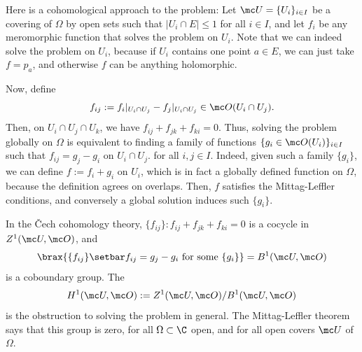 \documentclass[11pt]{report}
\begin{document}
Here is a cohomological approach to the problem: Let $\mc U=\{U_i\}_{i \in I}$ be a covering of $\Omega$ by open sets such that $|U_i \cap E| \leq 1$ for all $i \in I$, and let $f_i$ be any meromorphic function that solves the problem on $U_i$. Note that we can indeed solve the problem on $U_i$, because if $U_i$ contains one point $a \in E$, we can just take $f=p_a$, and otherwise $f$ can be anything holomorphic.

Now, define
$$f_{ij}:=f_i|_{U_i \cap U_j} - f_j|_{U_i \cap U_j} \in \mc O(U_i \cap U_j).$$
Then, on $U_i \cap U_j \cap U_k$, we have $f_{ij}+f_{jk}+f_{ki}=0$. Thus, solving the problem globally on $\Omega$ is equivalent to finding a family of functions $\{g_i \in \mc O(U_i)\}_{i \in I}$ such that $f_{ij}=g_j-g_i$ on $U_i \cap U_j$. for all $i,j \in I$. Indeed, given such a family $\{g_i\}$, we can define $f:= f_i+g_i$ on $U_i$, which is in fact a globally defined function on $\Omega$, because the definition agrees on overlaps. Then, $f$ satisfies the Mittag-Leffler conditions, and conversely a global solution induces such $\{g_i\}$.

In the \v{C}ech cohomology theory, $\{f_{ij}\} : f_{ij}+ f_{jk}+f_{ki}=0$ is a cocycle in $Z^1(\mc U,\mc O)$, and
$$\brax{\{f_{ij}\} \setbar f_{ij}=g_j-g_i \text{ for some } \{g_i\}  }=B^1(\mc U,\mc O)$$
is a coboundary group. The 
$$H^1(\mc U,\mc O):=Z^1(\mc U,\mc O)/B^1 (\mc U,\mc O)$$
is the obstruction to solving the problem in general. The Mittag-Leffler theorem says that this group is zero, for all $\Omega \subset \C$ open, and for all open covers $\mc U$ of $\Omega$.
\end{document}
